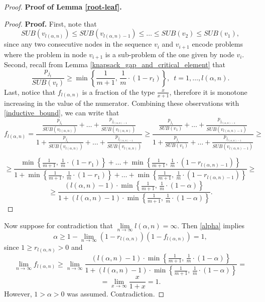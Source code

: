 \documentclass[moor,sglanonrev]{informs4}
\theoremstyle{plain}
\begin{document}
\begin{proof}{\textbf{Proof of Lemma \ref{root-leaf}.}}
    \begin{proof}{\textbf{Proof.}}
        First, note that
        \[
        SUB(v_{l(\alpha, n)}) \le SUB(v_{l(\alpha, n)-1}) \le \ldots \le SUB(v_2) \le SUB(v_1),
        \]
        since any two consecutive nodes in the sequence $v_i$ and $v_{i+1}$ encode problems where the problem in node $v_{i+1}$ is a sub-problem of the one given by node $v_i$. Second, recall from Lemma \ref{knapsack_gap_and_critical_element} that 
        \[
        \frac{p_{j_t}}{SUB(v_t)} \ge \min\left\{\frac{1}{m+1}, \,\frac{1}{m}\cdot (1-r_t) \right\}, \,\,\, t = 1, \ldots, l(\alpha, n).
        \]
        Last, notice that $f_{l(\alpha, n)}$ is a fraction of the type $\frac{x}{x+1}$, therefore it is monotone increasing in the value of the numerator. Combining these observations with \eqref{inductive_bound}, we can write that
        \[
        f_{l(\alpha, n)} = \frac{\frac{p_{j_1}}{SUB(v_{l(\alpha, n)})} + \ldots + \frac{p_{j_{l(\alpha, n)-1}}}{SUB(v_{l(\alpha, n)})}}
        {1 + \frac{p_{j_1}}{SUB(v_{l(\alpha, n)})} + \ldots + \frac{p_{j_{l(\alpha, n)-1}}}{SUB(v_{l(\alpha, n)})}} \ge 
        \frac{\frac{p_{j_1}}{SUB(v_1)} + \ldots + \frac{p_{j_{l(\alpha, n)-1}}}{SUB(v_{l(\alpha, n)-1})}}
        {1 + \frac{p_{j_1}}{SUB(v_1)} + \ldots + \frac{p_{j_{l(\alpha, n)-1}}}{SUB(v_{l(\alpha, n)-1})}} \ge
        \]

        \[
        \ge \frac{\min\left\{\frac{1}{m+1}, \, \frac{1}{m}\cdot (1-r_1)\right\} + \ldots + \min\left\{\frac{1}{m+1}, \, \frac{1}{m}\cdot (1-r_{l(\alpha,n)-1})\right\}}{1+\min\left\{\frac{1}{m+1}, \, \frac{1}{m}\cdot (1-r_1)\right\} + \ldots + \min\left\{\frac{1}{m+1}, \, \frac{1}{m}\cdot (1-r_{l(\alpha,n)-1})\right\}} \ge 
        \]
        \[
        \ge \frac{(l(\alpha, n) -1)\cdot \min\left\{\frac{1}{m+1},\, \frac{1}{m} \cdot (1-\alpha)\right\}}{1+(l(\alpha, n) -1)\cdot \min\left\{\frac{1}{m+1},\, \frac{1}{m} \cdot (1-\alpha)\right\}}.
        \]
        \hfill \Halmos
    \end{proof}

    Now suppose for contradiction that $\lim\limits_{n \to \infty} l(\alpha,n) = \infty$. Then \eqref{alpha} implies
    \[
    \alpha \ge 1- \lim\limits_{n \to \infty} (1-r_{l(\alpha,n)})(1-f_{l(\alpha, n)}) = 1,
    \]
    since $1 \ge r_{l(\alpha, n)} > 0$ and 
    \[
    \lim\limits_{n \to \infty} f_{l(\alpha, n)} \ge \lim\limits_{n \to \infty} \frac{(l(\alpha, n) -1)\cdot \min\left\{\frac{1}{m+1},\, \frac{1}{m} \cdot (1-\alpha)\right\}}{1+(l(\alpha, n) -1)\cdot \min\left\{\frac{1}{m+1},\, \frac{1}{m} \cdot (1-\alpha)\right\}} = 
    \]
    \[
    =\lim\limits_{x \to \infty} \frac{x}{1+x}=1.
    \]
    However, $1 > \alpha >0$ was assumed. Contradiction. \hfill \Halmos
\end{proof}
\end{document}
